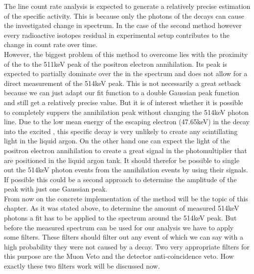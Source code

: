 The line count rate analysis is expected to generate a relatively precise estimation of the specific activity.
This is because only the photons of the \Kr decays can cause the investigated change in spectrum.
In the case of the second method however every radioactive isotopes residual in experimental setup contributes to the change in count rate over time.
\\ 

However, the biggest problem of this method to overcome lies with the proximity of the \Kr to the 511keV peak of the positron electron annihilation. 
Its peak is expected to partially dominate over the \Kr in the spectrum and does not allow for a direct measurement of the 514keV peak. 
This is not necessarily a great setback because we can just adapt our fit function to a double Gaussian peak function and still get a relatively precise value.
But it is of interest whether it is possible to completely suppers the annihilation peak without changing the 514keV photon line.
Due to the low mean energy of the escaping electron (47.65keV) in the \Kr decay into the excited , this specific decay is very unlikely to create any scintillating light in the liquid argon. 
On the other hand one can expect the light of the positron electron annihilation to create a great signal in the photomultiplier that are positioned in the liquid argon tank.
It should therefor be possible to single out the 514keV photon events from the annihilation events by using their signals.
If possible this could be a second approach to determine the amplitude of the peak with just one Gaussian peak.
\\

From now on the concrete implementation of the method will be the topic of this chapter.
As it was stated above, to determine the amount of measured 514keV photons a fit has to be applied to the spectrum around the 514keV peak. 
But before the measured spectrum can be used for our analysis we have to apply some filters.
These filters should filter out any event of which we can say with a high probability they were not caused by a \Kr decay.
Two very appropriate filters for this purpose are the Muon Veto and the detector anti-coincidence veto.
How exactly these two filters work will be discussed now.
\\

